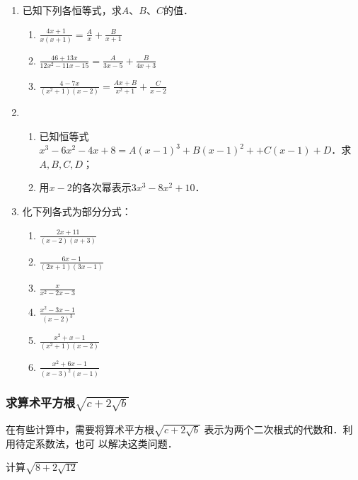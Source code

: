 \begin{ex}
\begin{enumerate}
    \item  已知下列各恒等式，求$A$、$B$、$C$的值．
    \begin{enumerate}
        \item $\frac{4x+1}{x(x+1)}=\frac{A}{x}+\frac{B}{x+1}$
        \item $\frac{46+13x}{12x^2-11x-15}=\frac{A}{3x-5}+\frac{B}{4x+3}$
        \item $\frac{4-7x}{(x^2+1)(x-2)}=\frac{Ax+B}{x^2+1}+\frac{C}{x-2}$
    \end{enumerate}
    \item \begin{enumerate}
        \item 已知恒等式$x^3-6x^2-4x+8=A(x-1)^3+B(x-1)^2+
        +C(x-1)+D$．求$A,B,C,D$；
        \item 用$x-2$的各次幂表示$3x^3-8x^2+10$．
    \end{enumerate}

    \item 化下列各式为部分分式：
    \begin{multicols}{2}
        \begin{enumerate}
    \item $\frac{2x+11}{(x-2)(x+3)}$
    \item $\frac{6x-1}{(2x+1)(3x-1)}$
    \item $\frac{x}{x^2-2x-3}$
    \item $\frac{x^2-3x-1}{(x-2)^3}$
    \item $\frac{x^2+x-1}{(x^2+1)(x-2)}$
    \item $\frac{x^2+6x-1}{(x-3)^2(x-1)}$
\end{enumerate}
    \end{multicols}
\end{enumerate}
    
\end{ex}

\subsubsection{求算术平方根$\sqrt{c+2\sqrt{b}}$}
在有些计算中，需要将算术平方根$\sqrt{c+2\sqrt{b}}$
表示为两个二次根式的代数和．利用待定系数法，也可
以解决这类问题．

\begin{example}
计算$\sqrt{8+2\sqrt{12}}$
\end{example}

